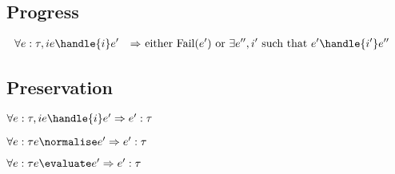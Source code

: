 \subsection{Progress}

\begin{align*}
  \forall e:\tau,i & e \handle{i} e' &\implies& \text{ either Fail}(e') \text{ or } \exists e'',i' \text{ such that } e'\handle{i'}e''&\\
\end{align*}

\subsection{Preservation}

\begin{theorem}
  $\forall e:\tau,i  e \handle{i} e' \implies e':\tau$
  \label{thmpreshandle}
\end{theorem}

\begin{theorem}
    $\forall e:\tau  e \normalise e' \implies e':\tau$
    \label{thmpresnorm}
\end{theorem}

\begin{theorem}
      $\forall e:\tau  e \evaluate e' \implies e':\tau$
      \label{thmpreseval}
\end{theorem}

